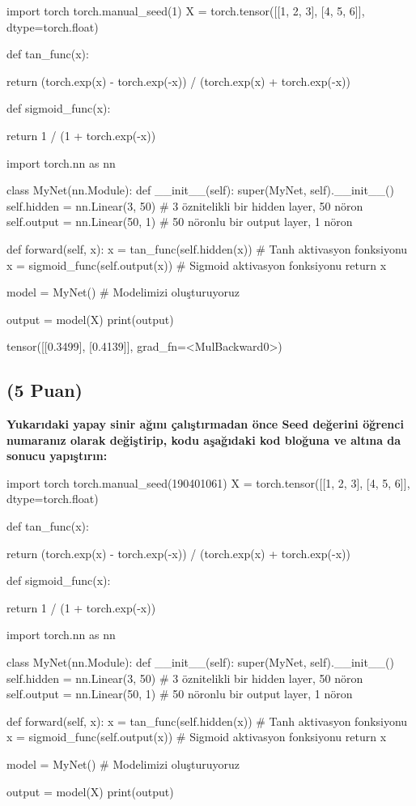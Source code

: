 \documentclass[11pt]{article}
\begin{document}
\begin{python}
import torch
torch.manual_seed(1)
X = torch.tensor([[1, 2, 3], [4, 5, 6]], dtype=torch.float)

def tan_func(x):

  return (torch.exp(x) - torch.exp(-x)) / (torch.exp(x) + torch.exp(-x))

def sigmoid_func(x):

  return 1 / (1 + torch.exp(-x))

import torch.nn as nn

class MyNet(nn.Module):
    def __init__(self):
        super(MyNet, self).__init__()
        self.hidden = nn.Linear(3, 50)  # 3 öznitelikli bir hidden layer, 50 nöron
        self.output = nn.Linear(50, 1)  # 50 nöronlu bir output layer, 1 nöron

    def forward(self, x):
        x = tan_func(self.hidden(x))  # Tanh aktivasyon fonksiyonu
        x = sigmoid_func(self.output(x))  # Sigmoid aktivasyon fonksiyonu
        return x

model = MyNet()  # Modelimizi oluşturuyoruz

output = model(X)
print(output)
\end{python}


tensor([[0.3499],
        [0.4139]], grad_fn=<MulBackward0>)

\subsection{(5 Puan)} \textbf{Yukarıdaki yapay sinir ağını çalıştırmadan önce Seed değerini öğrenci numaranız olarak değiştirip, kodu aşağıdaki kod bloğuna ve altına da sonucu yapıştırın:}

\begin{python}
import torch
torch.manual_seed(190401061)  
X = torch.tensor([[1, 2, 3], [4, 5, 6]], dtype=torch.float)  

def tan_func(x):

  return (torch.exp(x) - torch.exp(-x)) / (torch.exp(x) + torch.exp(-x))

def sigmoid_func(x):

  return 1 / (1 + torch.exp(-x))

import torch.nn as nn

class MyNet(nn.Module):
    def __init__(self):
        super(MyNet, self).__init__()
        self.hidden = nn.Linear(3, 50)  # 3 öznitelikli bir hidden layer, 50 nöron
        self.output = nn.Linear(50, 1)  # 50 nöronlu bir output layer, 1 nöron

    def forward(self, x):
        x = tan_func(self.hidden(x))  # Tanh aktivasyon fonksiyonu
        x = sigmoid_func(self.output(x))  # Sigmoid aktivasyon fonksiyonu
        return x

model = MyNet()  # Modelimizi oluşturuyoruz


output = model(X)
print(output)
\end{python}
\end{document}
